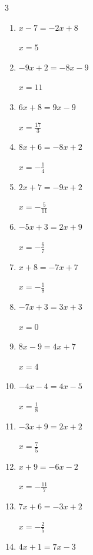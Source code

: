 \begin{multicols}{3}
\begin{enumerate}
        $\displaystyle x=\frac{11}{9}$

  \item $x-7=-2x+8$

        $\displaystyle x=5$

  \item $-9x+2=-8x-9$

        $\displaystyle x=11$

  \item $6x+8=9x-9$

        $\displaystyle x=\frac{17}{3}$

  \item $8x+6=-8x+2$

        $\displaystyle x=-\frac{1}{4}$

  \item $2x+7=-9x+2$

        $\displaystyle x=-\frac{5}{11}$

  \item $-5x+3=2x+9$

        $\displaystyle x=-\frac{6}{7}$

  \item $x+8=-7x+7$

        $\displaystyle x=-\frac{1}{8}$

  \item $-7x+3=3x+3$

        $\displaystyle x=0$

  \item $8x-9=4x+7$

        $\displaystyle x=4$

\columnbreak %

\resetques

  \item $-4x-4=4x-5$

        $\displaystyle x=\frac{1}{8}$

  \item $-3x+9=2x+2$

        $\displaystyle x=\frac{7}{5}$

  \item $x+9=-6x-2$

        $\displaystyle x=-\frac{11}{7}$

  \item $7x+6=-3x+2$

        $\displaystyle x=-\frac{2}{5}$

  \item $4x+1=7x-3$


\end{enumerate}
\end{multicols}
